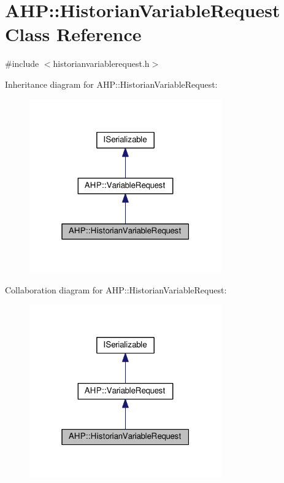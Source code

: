 \hypertarget{class_a_h_p_1_1_historian_variable_request}{}\section{A\+H\+P\+:\+:Historian\+Variable\+Request Class Reference}
\label{class_a_h_p_1_1_historian_variable_request}


{\ttfamily \#include $<$historianvariablerequest.\+h$>$}



Inheritance diagram for A\+H\+P\+:\+:Historian\+Variable\+Request\+:
\nopagebreak
\begin{figure}[H]
\begin{center}
\leavevmode
\includegraphics[width=235pt]{class_a_h_p_1_1_historian_variable_request__inherit__graph}
\end{center}
\end{figure}


Collaboration diagram for A\+H\+P\+:\+:Historian\+Variable\+Request\+:
\nopagebreak
\begin{figure}[H]
\begin{center}
\leavevmode
\includegraphics[width=235pt]{class_a_h_p_1_1_historian_variable_request__coll__graph}
\end{center}
\end{figure}
